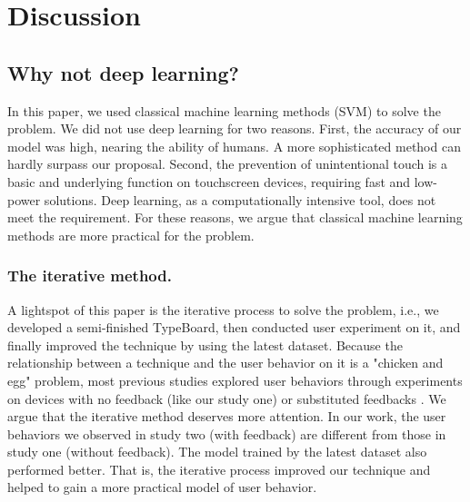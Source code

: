 \section{Discussion}

\subsection{Why not deep learning?}


In this paper, we used classical machine learning methods (SVM) to solve the problem. We did not use deep learning for two reasons. First, the accuracy of our model was high, nearing the ability of humans. A more sophisticated method can hardly surpass our proposal. Second, the prevention of unintentional touch is a basic and underlying function on touchscreen devices, requiring fast and low-power solutions. Deep learning, as a computationally intensive tool, does not meet the requirement. For these reasons, we argue that classical machine learning methods are more practical for the problem.

\subsubsection{The iterative method.}

A lightspot of this paper is the iterative process to solve the problem, i.e., we developed a semi-finished TypeBoard, then conducted user experiment on it, and finally improved the technique by using the latest dataset. Because the relationship between a technique and the user behavior on it is a "chicken and egg" problem, most previous studies explored user behaviors through experiments on devices with no feedback (like our study one) \cite{2012-IdentifyUnint, 2014-PenMightier, 2018-PalmTouch} or substituted feedbacks \cite{2013-TapBoard, 2020-TabletopTouch}. We argue that the iterative method deserves more attention. In our work, the user behaviors we observed in study two (with feedback) are different from those in study one (without feedback). The model trained by the latest dataset also performed better. That is, the iterative process improved our technique and helped to gain a more practical model of user behavior.

